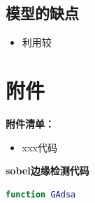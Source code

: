 \documentclass{my_paper}
\begin{document}
\subsection{模型的缺点}
\begin{itemize}
    \item 利用较

\end{itemize}

\newpage
\begin{center}
\end{center}

\newpage
\section{附件}
\textbf{附件清单：}
\renewcommand\theenumi{\roman{enumi}}
\renewcommand\labelenumi{\textbf{附录\theenumi}}
\begin{itemize}
    \item xxx代码
\end{itemize}

\textbf{sobel边缘检测代码}

\begin{lstlisting}[language=matlab]
    function GAdsa 
\end{lstlisting}
\end{document}
